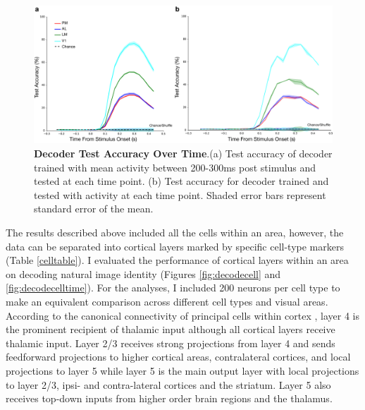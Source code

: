 \begin{figure}
  \centering
    	\includegraphics[width=\textwidth]{Figures/chapter5/accuracy_time.png}
    \caption[Decoder Test Accuracy Over Time]{\textbf{Decoder Test Accuracy Over Time}.(a) Test accuracy of decoder trained with mean activity between 200-300ms post stimulus and tested at each time point. (b) Test accuracy for decoder trained and tested with activity at each time point. Shaded error bars represent standard error of the mean. }
  \label{fig:decodetime}
\end{figure}
The results described above included all the cells within an area, however, the data can be separated into cortical layers marked by specific cell-type markers (Table \ref{celltable}). I evaluated the performance of cortical layers within an area on decoding natural image identity (Figures \ref{fig:decodecell} and \ref{fig:decodecelltime}). For the analyses, I included 200 neurons per cell type to make an equivalent comparison across different cell types and visual areas. According to the canonical connectivity of principal cells within cortex \parencite{Harris2013}, layer 4 is the prominent recipient of thalamic input although all cortical layers receive thalamic input. Layer 2/3 receives strong projections from layer 4 and sends feedforward projections to higher cortical areas, contralateral cortices, and local projections to layer 5 while layer 5 is the main output layer with local projections to layer 2/3, ipsi- and contra-lateral cortices and the striatum. Layer 5 also receives top-down inputs from higher order brain regions and the thalamus. \par 
